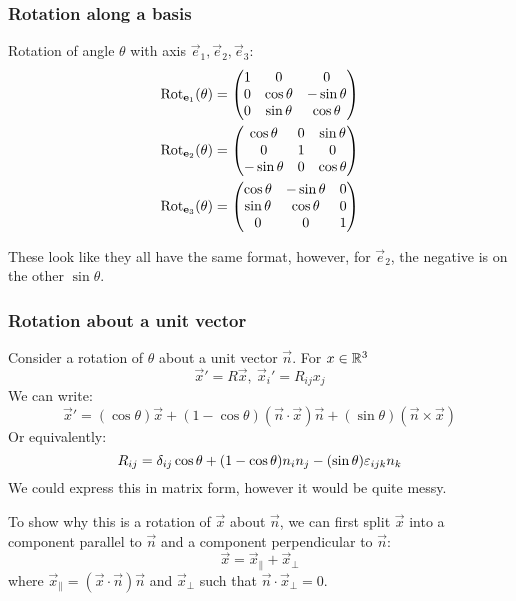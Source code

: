 \documentclass[../main.tex]{subfiles}
\begin{document}
\subsubsection{Rotation along a basis}
Rotation of angle $\theta$ with axis $\vec{e}_1, \vec{e}_2, \vec{e}_3$:
\begin{align*}
  \operatorname{Rot}_{\boldsymbol{\mathbf{e}}_1}(\theta) &= \begin{pmatrix}
  1 & 0 & 0 \\
  0 & \cos \theta & -\sin \theta \\
  0 & \sin \theta & \cos \theta \\
  \end{pmatrix} \\
  \operatorname{Rot}_{\boldsymbol{\mathbf{e}}_2}(\theta) &= \begin{pmatrix}
  \cos \theta & 0 & \sin \theta \\
  0 & 1 & 0 \\
  - \sin \theta & 0 & \cos \theta \\
  \end{pmatrix} \\
  \operatorname{Rot}_{\boldsymbol{\mathbf{e}}_3}(\theta) &= \begin{pmatrix}
  \cos \theta & -\sin \theta & 0 \\
  \sin \theta & \cos \theta & 0 \\
  0 & 0 & 1 \\
  \end{pmatrix}
\end{align*}
\begin{remark}[Warning]
  These look like they all have the same format, however, for $\vec{e}_2$, the negative is on the other $\sin \theta$.
\end{remark}
\subsubsection{Rotation about a unit vector}
Consider a rotation of $\theta$ about a unit vector $\vec{n}$.
For $x \in \mathbb{R}^{3}$
\[
  \vec{x}' = R\vec{x},\ \vec{x}_i' = R_{i j}x_j
\]
We can write:
\[
  \vec{x}' = (\cos \theta)\vec{x} + (1 - \cos \theta)(\vec{n} \cdot \vec{x})\vec{n} + (\sin \theta)(\vec{n} \times \vec{x})
\]
Or equivalently:
\[
  R_{i j} = \delta_{i j}\cos\theta + (1 - \cos \theta)n_in_j - (\sin \theta)\varepsilon_{i j k}n_k
\]
We could express this in matrix form, however it would be quite messy.

To show why this is a rotation of $\vec{x}$ about $\vec{n}$, we can first split $\vec{x}$ into a component parallel to $\vec{n}$ and a component perpendicular to $\vec{n}$:
\[
  \vec{x} = \vec{x}_{\parallel} + \vec{x}_{\perp}
\]
where $\vec{x}_{\parallel} = (\vec{x} \cdot \vec{n})\vec{n}$ and $\vec{x}_{\perp}$ such that $\vec{n} \cdot \vec{x}_{\perp} = 0$.
\end{document}
